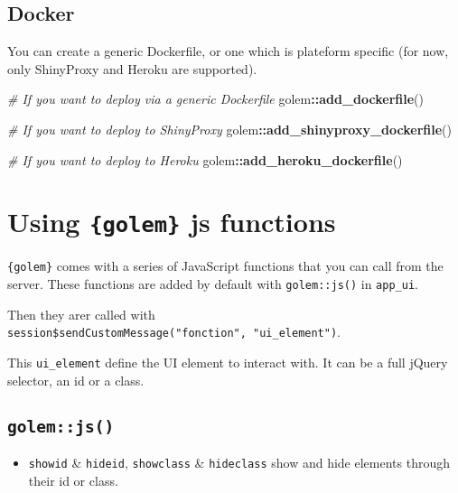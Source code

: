 \documentclass[]{book}
\newenvironment{Shaded}{\begin{snugshade}}{\end{snugshade}}
\newcommand{\CommentTok}[1]{\textcolor[rgb]{0.56,0.35,0.01}{\textit{#1}}}
\newcommand{\KeywordTok}[1]{\textcolor[rgb]{0.13,0.29,0.53}{\textbf{#1}}}
\newcommand{\NormalTok}[1]{#1}
\newcommand{\OperatorTok}[1]{\textcolor[rgb]{0.81,0.36,0.00}{\textbf{#1}}}
\providecommand{\tightlist}{%
  \setlength{\itemsep}{0pt}\setlength{\parskip}{0pt}}
\begin{document}
\hypertarget{docker}{%
\subsection{Docker}\label{docker}}

You can create a generic Dockerfile, or one which is plateform specific (for now, only ShinyProxy and Heroku are supported).

\begin{Shaded}
\begin{Highlighting}[]
\CommentTok{# If you want to deploy via a generic Dockerfile}
\NormalTok{golem}\OperatorTok{::}\KeywordTok{add_dockerfile}\NormalTok{()}

\CommentTok{# If you want to deploy to ShinyProxy}
\NormalTok{golem}\OperatorTok{::}\KeywordTok{add_shinyproxy_dockerfile}\NormalTok{()}

\CommentTok{# If you want to deploy to Heroku}
\NormalTok{golem}\OperatorTok{::}\KeywordTok{add_heroku_dockerfile}\NormalTok{()}
\end{Highlighting}
\end{Shaded}

\hypertarget{using-golem-js-functions}{%
\section{\texorpdfstring{Using \texttt{\{golem\}} js functions}{Using \{golem\} js functions}}\label{using-golem-js-functions}}

\texttt{\{golem\}} comes with a series of JavaScript functions that you can call from the server. These functions are added by default with \texttt{golem::js()} in \texttt{app\_ui}.

Then they arer called with \texttt{session\$sendCustomMessage("fonction",\ "ui\_element")}.

This \texttt{ui\_element} define the UI element to interact with. It can be a full jQuery selector, an id or a class.

\hypertarget{golemjs}{%
\subsection{\texorpdfstring{\texttt{golem::js()}}{golem::js()}}\label{golemjs}}

\begin{itemize}
\tightlist
\item
  \texttt{showid} \& \texttt{hideid}, \texttt{showclass} \& \texttt{hideclass} show and hide elements through their id or class.
\end{itemize}
\end{document}
